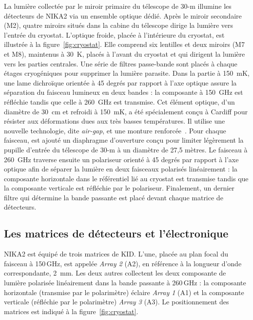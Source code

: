 La lumière collectée par le miroir primaire du télescope de 30-m
illumine les détecteurs de NIKA2 via un ensemble optique dédié. Après
le miroir secondaire (M2), quatre miroirs situés dans la cabine du
télescope dirige la lumière vers l'entrée du cryostat. L'optique
froide, placée à l'intérieure du cryostat, est illustrée à la
figure~\ref{fig:cryostat}. Elle comprend six lentilles et deux miroirs
(M7 et M8), maintenus à 30~K, placés à l'avant du cryostat et qui
dirigent la lumière vers les parties centrales. Une série de filtres
passe-bande sont placés à chaque étages cryogéniques pour supprimer la
lumière parasite. 
Dans la partie à 150~mK, une lame dichroïque orientée à 45
degrés par rapport à l'axe optique assure la séparation du faisceau
lumineux en deux bandes : la composante à 150~GHz est réfléchie
tandis que celle à 260~GHz est transmise. Cet élément optique, d'un
diamètre de 30~cm et refroidi à 150~mK, a été spécialement conçu à
Cardiff pour résister aux déformations dues aux très basses
températures. Il utilise une nouvelle technologie, dite
\emph{air-gap}, et une monture renforcée~\citep{Perotto2019}. Pour chaque faisceau, est
ajouté un diaphragme d'ouverture conçu pour limiter légèrement la
pupille d'entrée du télescope de 30-m à un diamètre de 27,5 mètres.   
Le faisceau à 260~GHz traverse ensuite un polariseur
orienté à 45 degrés par rapport à l'axe optique afin de séparer la lumière en
deux faisceaux polarisés linéairement : la composante horizontale dans
le référentiel lié au cryostat est transmise tandis que la composante
verticale est réfléchie par le polariseur.
Finalement, un dernier filtre qui détermine la bande passante est
placé devant chaque matrice de détecteurs.

\subsection{Les matrices de détecteurs et l'électronique}
\label{se:matrices}

NIKA2 est équipé de trois matrices de KID. L'une, placée au plan focal du
faisceau à 150\,GHz, est appelée \emph{Array 2} (A2), en référence à la
longueur d'onde correspondante, 2~mm. Les deux autres collectent les
deux composante de lumière polarisée linéairement dans la bande
passante à 260\,GHz : la composante horizontale (transmise par le
polarimètre) éclaire \emph{Array 1} (A1) et la composante verticale
(réfléchie par le polarimètre) \emph{Array 3} (A3). Le positionnement
des matrices est indiqué à la figure~\ref{fig:cryostat}. 

